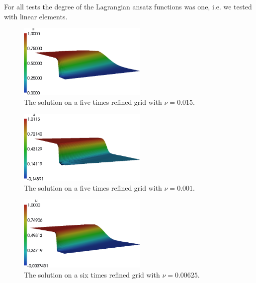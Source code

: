 \documentclass[a4paper, 11pt, twoside]{article}
\begin{document}
For all tests the degree of the Lagrangian ansatz functions was one, i.e. we tested with linear elements.

\begin{figure}[htbp]
\begin{center}
\includegraphics[width=0.55\textwidth]{fig/5_0,015_gedreht.png}
\caption{The solution on a five times refined grid with $\nu = 0.015$.}
\label{reflevel5_nu0,015}
\end{center}
\end{figure}

\begin{figure}[htbp]
\begin{center}
\includegraphics[width=0.55\textwidth]{fig/5_0,001_gedreht.png}
\caption{The solution on a five times refined grid with $\nu = 0.001$.}
\label{reflevel5_nu0,001}
\end{center}
\end{figure}

\begin{figure}[htbp]
\begin{center}
\includegraphics[width=0.55\textwidth]{fig/6_0,00625.png}
\caption{The solution on a six times refined grid with $\nu = 0.00625$.}
\label{reflevel6_nu0,00625}
\end{center}
\end{figure}
\end{document}
